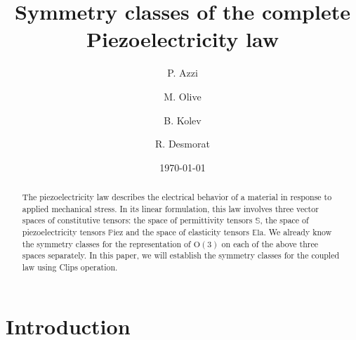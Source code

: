 \documentclass[11pt,a4paper]{amsart}
\theoremstyle{definition}
\newcommand{\Ela}{\mathbb{E}\mathrm{la}}    %
\newcommand{\Piez}{\mathbb{P}\mathrm{iez}}  %
\newcommand{\Sym}{\mathbb{S}}               %
\newcommand{\OO}{\mathrm{O}}                %
\newcommand{\1}{\mathds{1}}		            %
\begin{document}
\title{Symmetry classes of the complete Piezoelectricity law}%

\author{P. Azzi}
\address[Perla Azzi]{xxx, France}

\author{M. Olive}
\address[Marc Olive]{Universit\'{e} Paris-Saclay, ENS Paris-Saclay, CNRS, LMT - Laboratoire de M\'{e}canique et Technologie, 94235, Cachan, France}

\author{B. Kolev}
\address[Boris Kolev]{Universit\'{e} Paris-Saclay, ENS Paris-Saclay, CNRS, LMT - Laboratoire de M\'{e}canique et Technologie, 94235, Cachan, France}

\author{R. Desmorat}
\address[Rodrigue Desmorat]{Universit\'{e} Paris-Saclay, ENS Paris-Saclay, CNRS, LMT - Laboratoire de M\'{e}canique et Technologie, 94235, Cachan, France}


%
\keywords{}%

\date{\today}%

\begin{abstract}
 The piezoelectricity law describes the electrical behavior of a material in response to applied mechanical stress. In its linear formulation, this law involves three vector spaces of constitutive tensors: the space of permittivity tensors $\Sym$, the space of piezoelectricity tensors $\Piez$ and the space of elasticity tensors $\Ela$. We already know the symmetry classes for the representation of $\OO(3)$ on each of the above three spaces separately.  In this paper, we will establish the symmetry classes for the coupled law using Clips operation.
\end{abstract}

\maketitle


\begin{scriptsize}
  \setcounter{tocdepth}{2}
  \tableofcontents
\end{scriptsize}

\section{Introduction}
\label{sec:intro}
\end{document}
